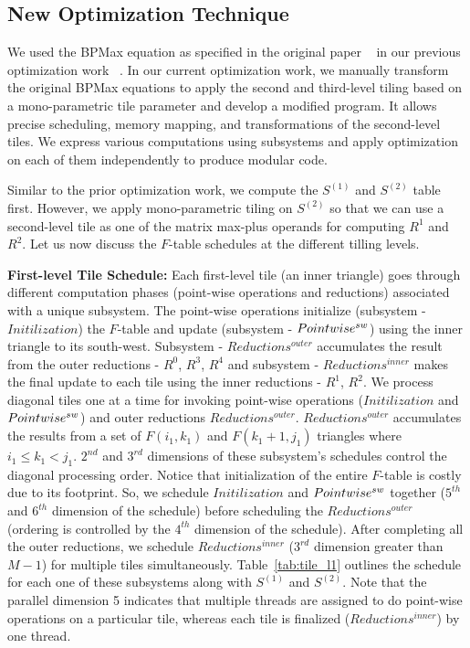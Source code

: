 




\subsection{New Optimization Technique}
We used the BPMax equation as specified in the original paper ~\cite{EbrahimpourBoroojeny2021} in our previous optimization work ~\cite{Mondal2021}. In our current optimization work, we manually transform the original BPMax equations to apply the second and third-level tiling based on a mono-parametric tile parameter and develop a modified \alfa program. It allows precise scheduling, memory mapping, and transformations of the second-level tiles. We express various computations using subsystems and apply optimization on each of them independently to produce modular code.

Similar to the prior optimization work, we compute the $S^{(1)}$ and $S^{(2)}$ table first. However, we apply mono-parametric tiling on $S^{(2)}$ so that we can use a second-level tile as one of the matrix max-plus operands for computing $R^{1}$ and  $R^{2}$. Let us now discuss the $F$-table schedules at the different tilling levels.

\textbf{First-level Tile Schedule:}
Each first-level tile (an inner triangle) goes through different computation phases (point-wise operations and reductions) associated with a unique subsystem. The point-wise operations initialize (subsystem - $Initilization$) the $F$-table and update (subsystem - $Point\-wise^{sw}$) using the inner triangle to its south-west. Subsystem - $Reductions^{outer}$ accumulates the result from the outer reductions - $R^{0}$, $R^{3}$, $R^{4}$ and subsystem - $Reductions^{inner}$ makes the final update to each tile using the  inner reductions - $R^{1}$, $R^{2}$. We process diagonal tiles one at a time for invoking point-wise operations ($Initilization$ and $Point\-wise^{sw}$) and outer reductions $Reductions^{outer}$. $Reductions^{outer}$ accumulates the results from a set of $F(i_{1}, k_{1})$ and $F(k_{1}+1, j_{1})$ triangles where $i_{1} \le k_{1} < j_{1}$.  $2^{nd}$ and $3^{rd}$ dimensions of these subsystem's schedules control the diagonal processing order. 
Notice that initialization of the entire $F$-table is costly due to its footprint. So, we schedule $Initilization$ and $Point\-wise^{sw}$ together ($5^{th}$ and $6^{th}$ dimension of the schedule) before scheduling the $Reductions^{outer}$ (ordering is controlled by the $4^{th}$ dimension of the schedule). After completing all the outer reductions, we schedule $Reductions^{inner}$ ($3^{rd}$ dimension greater than $M-1$) for multiple tiles simultaneously. Table~\ref{tab:tile_l1} outlines the schedule for each one of these subsystems along with $S^{(1)}$ and $S^{(2)}$.
Note that the parallel dimension 5 indicates that multiple threads are assigned to do point-wise operations on a particular tile, whereas each tile is finalized ($Reductions^{inner}$) by one thread.


